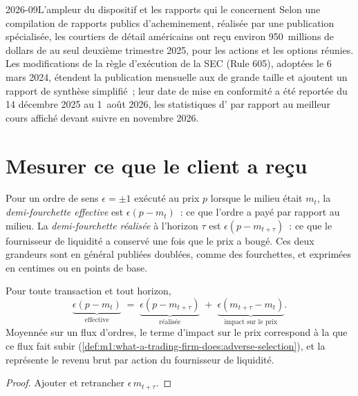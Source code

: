 \begin{dated}{2026-09}{L'ampleur du dispositif et les rapports qui le concernent}\label{dat:m1:retail-flow-and-wholesaling:scale}
Selon une compilation de rapports publics d'acheminement, réalisée par une publication spécialisée, les
courtiers de détail américains ont reçu environ 950~millions de dollars de  au
seul deuxième trimestre 2025, pour les actions et les options réunies. Les modifications
de la règle d'exécution de la SEC (Rule 605), adoptées le 6 mars 2024, étendent
la publication mensuelle aux  de grande taille et ajoutent un rapport
de synthèse simplifié~; leur date de mise en conformité a été reportée du 14 décembre 2025
au 1~août 2026, les statistiques d' par rapport au meilleur cours
affiché devant suivre en novembre 2026.
\end{dated}

\section{Mesurer ce que le client a reçu}

\begin{definition}\label{def:m1:retail-flow-and-wholesaling:effective}
Pour un ordre de sens $\epsilon = \pm1$ exécuté au prix $p$ lorsque le milieu
était $m_t$, la \emph{demi-fourchette effective} est
$\epsilon(p - m_t)$~: ce que l'ordre a payé par rapport au milieu. La
\emph{demi-fourchette réalisée} à l'horizon $\tau$ est
$\epsilon(p - m_{t+\tau})$~: ce que le fournisseur de liquidité a conservé une fois
que le prix a bougé. Ces deux grandeurs sont en général publiées doublées, comme des
fourchettes, et exprimées en centimes ou en points de base.
\end{definition}

\begin{proposition}\label{prop:m1:retail-flow-and-wholesaling:identity}
Pour toute transaction et tout horizon,
\[
\underbrace{\epsilon(p - m_t)}_{\text{effective}}
\;=\;
\underbrace{\epsilon(p - m_{t+\tau})}_{\text{réalisée}}
\;+\;
\underbrace{\epsilon(m_{t+\tau} - m_t)}_{\text{impact sur le prix}} .
\]
Moyennée sur un flux d'ordres, le terme d'impact sur le prix correspond à la  que ce flux fait subir (\cref{def:m1:what-a-trading-firm-does:adverse-selection}),
et la  représente le revenu brut par action du fournisseur de liquidité.
\end{proposition}
\begin{proof}
Ajouter et retrancher $\epsilon\,m_{t+\tau}$.
\end{proof}


